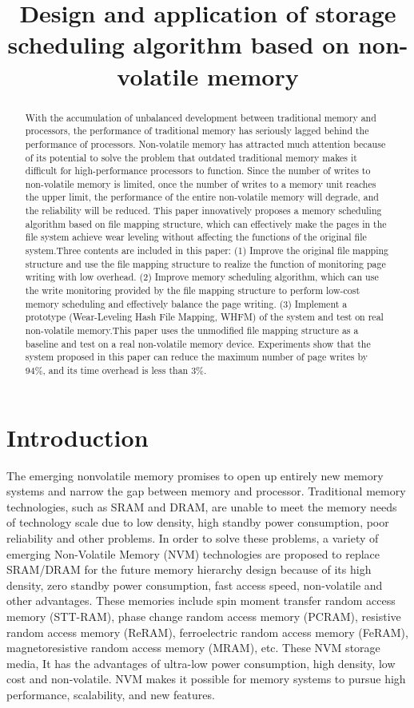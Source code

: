 \documentclass[twocolumn]{article}
\title{\textbf{Design and application of storage scheduling	algorithm based on non-volatile memory}}
\begin{document}
\maketitle
	\begin{abstract}
		With the accumulation of unbalanced development between traditional memory 
		and processors, the performance of traditional memory has seriously lagged 
		behind the performance of processors. Non-volatile memory has attracted 
		much attention because of its potential to solve the problem that outdated 
		traditional memory makes it difficult for high-performance processors to 
		function. Since the number of writes to non-volatile memory is limited, once 
		the number of writes to a memory unit reaches the upper limit, the performance 
		of the entire non-volatile memory will degrade, and the reliability will 
		be reduced. This paper innovatively proposes a memory scheduling algorithm 
		based on file mapping structure, which can effectively make the pages in 
		the file system achieve wear leveling without affecting the functions of 
		the original file system.Three contents are included in this paper: 
		(1) Improve the original file mapping structure and use the file mapping 
		structure to realize the function of monitoring page writing with low 
		overhead. (2) Improve memory scheduling algorithm, which can use the 
		write monitoring provided by the file mapping structure to perform 
		low-cost memory scheduling and effectively balance the page writing. 
		(3) Implement a prototype (Wear-Leveling Hash File Mapping, WHFM) of 
		the system and test on real non-volatile memory.This paper uses the 
		unmodified file mapping structure as a baseline and test on a real 
		non-volatile memory device. Experiments show that the system proposed 
		in this paper can reduce the maximum number of page writes by 94\%, and 
		its time overhead is less than 3\%.
	\end{abstract}
	\section{Introduction}
	The emerging nonvolatile memory promises to open up entirely new memory systems and narrow the gap between memory and processor. Traditional memory technologies, such as SRAM and DRAM, are unable to meet the memory needs of technology scale due to low density, high standby power consumption, poor reliability and other problems. In order to solve these problems, a variety of emerging Non-Volatile Memory (NVM) technologies are proposed to replace SRAM/DRAM for the future memory hierarchy design because of its high density, zero standby power consumption, fast access speed, non-volatile and other advantages. These memories include spin moment transfer random access memory (STT-RAM), phase change random access memory (PCRAM), resistive random access memory (ReRAM), ferroelectric random access memory (FeRAM), magnetoresistive random access memory (MRAM), etc. These NVM storage media, It has the advantages of ultra-low power consumption, high density, low cost and non-volatile. NVM makes it possible for memory systems to pursue high performance, scalability, and new features.
	
\end{document}
